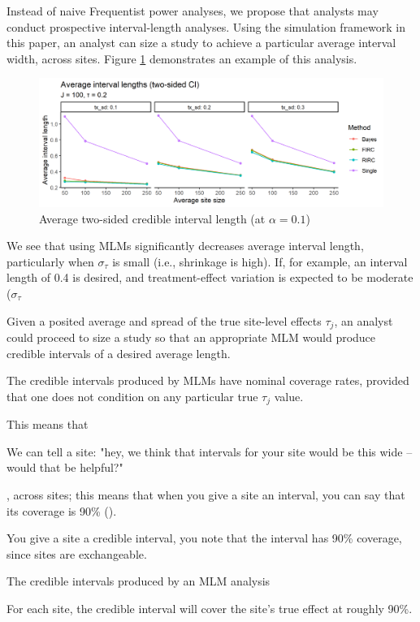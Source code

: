 \documentclass[]{article}
\begin{document}
Instead of naive Frequentist power analyses, we propose that analysts may conduct prospective interval-length analyses.
Using the simulation framework in this paper, an analyst can size a study to achieve a particular average interval width, across sites.
Figure \ref{fig:length_plot} demonstrates an example of this analysis.
\begin{figure}[ht]
	\centering
	\includegraphics[width=\textwidth]{writeup/images/length_plot.png}
	\caption{Average two-sided credible interval length (at $\alpha = 0.1$)}
	\label{fig:length_plot}
\end{figure}
We see that using MLMs significantly decreases average interval length, particularly when $\sigma_\tau$ is small (i.e., shrinkage is high).
If, for example, an interval length of 0.4 is desired, and treatment-effect variation is expected to be moderate ($\sigma_\tau$


Given a posited average and spread of the true site-level effects $\tau_j$, an analyst could proceed to size a study so that an appropriate MLM would produce credible intervals of a desired average length.


The credible intervals produced by MLMs have nominal coverage rates, provided that one does not condition on any particular true $\tau_j$ value.


This means that 

We can tell a site: "hey, we think that intervals for your site would be this wide -- would that be helpful?"


, across sites; this means that when you give a site an interval, you can say that its coverage is 90\% ().


You give a site a credible interval,
you note that the interval has 90\% coverage, since sites are exchangeable.

The credible intervals produced by an MLM analysis 

For each site, the credible interval will cover the site's true effect at roughly 90\%.
\end{document}
